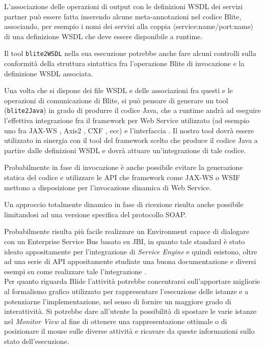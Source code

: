 L'associazione delle operazioni di output con le definizioni WSDL dei servizi
partner può essere fatta inserendo alcune meta-annotazioni nel codice Blite,
associando, per esempio i nomi dei servizi alla coppia
$\langle$service:name/port:name$\rangle$ di una definizione WSDL che deve
essere disponibile a runtime.

Il tool \texttt{blite2WSDL} nella sua esecuzione potrebbe anche fare alcuni
controlli sulla conformità della struttura sintattica fra l'operazione Blite di
invocazione e la definizione WSDL associata.

Una volta che si dispone dei file WSDL e delle associazioni fra questi e le
operazioni di comunicazione di Blite, si può pensare di generare un tool
(\texttt{blite2Java}) in grado di produrre il codice Java, che a
runtime andrà ad eseguire l'effettiva integrazione fra il framework per Web
Service utilizzato (ad esempio uno fra JAX-WS \cite{JAXWS}, Axis2 \cite{AXIS},
CXF \cite{CXF}, ecc) e l'interfaccia . Il nostro tool
dovrà essere utilizzato in sinergia con il tool del framework scelto che produce
il codice Java a partire dalle definizioni WSDL e dovrà attuare un'integrazione
di tale codice.

Probabilmente in fase di invocazione è anche possibile evitare la generazione
statica del codice e utilizzare le API che framework come JAX-WS o WSIF mettono
a disposizione per l'invocazione dinamica di Web Service.

Un approccio totalmente dinamico in fase di ricezione risulta anche possibile
limitandosi ad una versione specifica del protocollo SOAP.

Probabilmente risulta più facile realizzare un Environment capace di dialogare
con un Enterprise Service Bus basato su JBI, in quanto tale standard è stato
ideato appositamente per l'integrazione di \emph{Service Engine} e quindi
esistono, oltre ad una serie di API appositamente studiate una buona
documentazione e diversi esempi su come realizzare tale l'integrazione
\cite{OPENESB}.
\\

Per quanto riguarda Blide l'attività potrebbe concentrarsi sull'apportare
migliorie al formalismo grafico utilizzato per rappresentare l'esecuzione delle
istanze e a potenziarne l'implementazione, nel senso di fornire un maggiore
grado di interattività. Si potrebbe dare all'utente la possibilità di spostare
le varie istanze nel \emph{Monitor View} al fine di ottenere una
rappresentazione ottimale o di posizionare il mouse sulle diverse attività e
ricavare da queste informazioni sullo stato dell'esecuzione.





